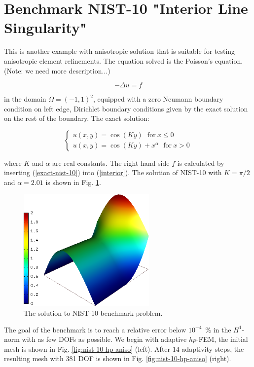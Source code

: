 \section{Benchmark NIST-10 "Interior Line Singularity"}
\label{sec:bench-10}

This is another example with anisotropic solution that is suitable for testing
anisotropic element refinements. The equation solved is the Poisson's equation.
(Note: we need more description...)

\begin{equation} \label{interior}
-\Delta u = f
\end{equation}

in the domain $\Omega = (-1, 1)^2$, equipped with a zero
Neumann boundary condition on left edge, Dirichlet boundary 
conditions given by the exact solution on the rest of the boundary.
The exact solution:

\begin{equation}\label{exact-nist-10}
\left\{
\begin{array}{l}
\displaystyle
u(x,y) = \cos(Ky)\ \ \ \mbox{for}\ x \le 0 \\
u(x,y) = \cos(Ky) + x^{\alpha}\ \ \ \mbox{for}\ x > 0
\end{array}
\right.
\end{equation}

where $K$ and $\alpha$ are real constants.
The right-hand side $f$ is calculated by inserting
(\ref{exact-nist-10}) into (\ref{interior}).
The solution of NIST-10 with $K = \pi/2$ and
$\alpha = 2.01$ is shown in Fig. \ref{fig:sln-nist10}.

\begin{figure}[!ht]
\centering
\includegraphics[height=6cm]{nist/nist-10/solution.png}
\caption{The solution to NIST-10 benchmark problem.}
\label{fig:sln-nist10}
\end{figure}

The goal of the benchmark is to reach a relative error below
$10^{-4}$~\% in the $H^1$-norm with as few DOFs as possible.
We begin with adaptive $hp$-FEM, 
the initial mesh is shown in Fig. \ref{fig:nist-10-hp-aniso} (left).
After 14 adaptivity steps, the resulting mesh with 381 DOF is shown 
in Fig. \ref{fig:nist-10-hp-aniso} (right).

